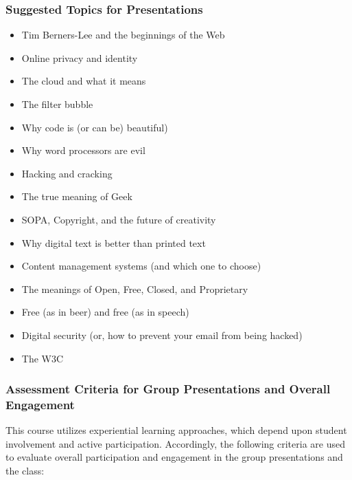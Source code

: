 \documentclass[letterpaper,10pt,headsepline]{scrreprt}
\begin{document}
\subsubsection{Suggested Topics for Presentations}

\begin{itemize}
\item Tim Berners-Lee and the beginnings of the Web
\item Online privacy and identity
\item The cloud and what it means
\item The filter bubble
\item Why code is (or can be) beautiful)
\item Why word processors are evil
\item Hacking and cracking
\item The true meaning of Geek
\item SOPA, Copyright, and the future of creativity
\item Why digital text is better than printed text
\item Content management systems (and which one to choose)
\item The meanings of Open, Free, Closed, and Proprietary
\item Free (as in beer) and free (as in speech)
\item Digital security (or, how to prevent your email from being hacked)
\item The W3C

\end{itemize}

\subsubsection{Assessment Criteria for Group Presentations and Overall Engagement}

This course utilizes experiential learning approaches, which depend upon student involvement and active participation. Accordingly, the following criteria are used to evaluate overall participation and engagement in the group presentations and the class:
\end{document}
